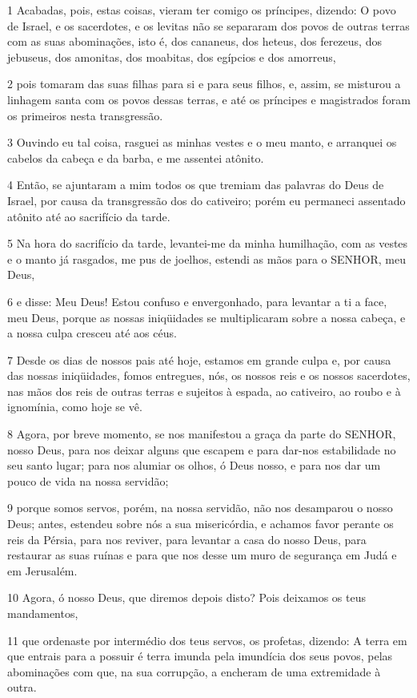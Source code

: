 \par 1 Acabadas, pois, estas coisas, vieram ter comigo os príncipes, dizendo: O povo de Israel, e os sacerdotes, e os levitas não se separaram dos povos de outras terras com as suas abominações, isto é, dos cananeus, dos heteus, dos ferezeus, dos jebuseus, dos amonitas, dos moabitas, dos egípcios e dos amorreus,
\par 2 pois tomaram das suas filhas para si e para seus filhos, e, assim, se misturou a linhagem santa com os povos dessas terras, e até os príncipes e magistrados foram os primeiros nesta transgressão.
\par 3 Ouvindo eu tal coisa, rasguei as minhas vestes e o meu manto, e arranquei os cabelos da cabeça e da barba, e me assentei atônito.
\par 4 Então, se ajuntaram a mim todos os que tremiam das palavras do Deus de Israel, por causa da transgressão dos do cativeiro; porém eu permaneci assentado atônito até ao sacrifício da tarde.
\par 5 Na hora do sacrifício da tarde, levantei-me da minha humilhação, com as vestes e o manto já rasgados, me pus de joelhos, estendi as mãos para o SENHOR, meu Deus,
\par 6 e disse: Meu Deus! Estou confuso e envergonhado, para levantar a ti a face, meu Deus, porque as nossas iniqüidades se multiplicaram sobre a nossa cabeça, e a nossa culpa cresceu até aos céus.
\par 7 Desde os dias de nossos pais até hoje, estamos em grande culpa e, por causa das nossas iniqüidades, fomos entregues, nós, os nossos reis e os nossos sacerdotes, nas mãos dos reis de outras terras e sujeitos à espada, ao cativeiro, ao roubo e à ignomínia, como hoje se vê.
\par 8 Agora, por breve momento, se nos manifestou a graça da parte do SENHOR, nosso Deus, para nos deixar alguns que escapem e para dar-nos estabilidade no seu santo lugar; para nos alumiar os olhos, ó Deus nosso, e para nos dar um pouco de vida na nossa servidão;
\par 9 porque somos servos, porém, na nossa servidão, não nos desamparou o nosso Deus; antes, estendeu sobre nós a sua misericórdia, e achamos favor perante os reis da Pérsia, para nos reviver, para levantar a casa do nosso Deus, para restaurar as suas ruínas e para que nos desse um muro de segurança em Judá e em Jerusalém.
\par 10 Agora, ó nosso Deus, que diremos depois disto? Pois deixamos os teus mandamentos,
\par 11 que ordenaste por intermédio dos teus servos, os profetas, dizendo: A terra em que entrais para a possuir é terra imunda pela imundícia dos seus povos, pelas abominações com que, na sua corrupção, a encheram de uma extremidade à outra.

